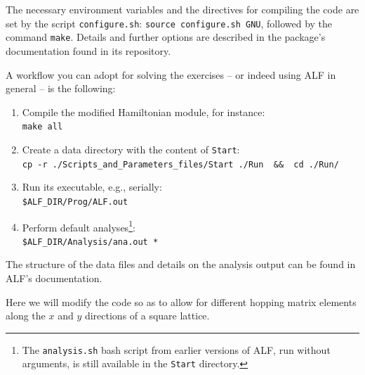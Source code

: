\documentclass[10pt,modern]{scrartcl}
\numberwithin{exerciseitem}{exercise} %
\begin{document}
The necessary environment variables and the directives for compiling the code are set by the script \texttt{configure.sh}: \lstinline[style=bash]|source configure.sh GNU|, followed by the command  \lstinline[style=bash,morekeywords={make}]|make|. Details and further options are described in the package's documentation found in its repository.

A workflow you can adopt for solving the exercises -- or indeed using ALF in general -- is the following:
\begin{enumerate}
	\item Compile the modified Hamiltonian module, for instance:\\
	\lstinline[style=bash,morekeywords={make}]{make all}
	\item Create a data directory with the content of \texttt{Start}:\\
	\lstinline[style=bash,morekeywords={cp}]{cp -r ./Scripts_and_Parameters_files/Start ./Run  &&  cd ./Run/}
	\item Run its executable, e.g., serially:\\
	\lstinline[style=bash]{$ALF_DIR/Prog/ALF.out} %
	\item Perform default analyses\footnote{The \texttt{analysis.sh} bash script from earlier versions of ALF, run without arguments, is still available in the \texttt{Start} directory.}:\\
	\lstinline[style=bash]{$ALF_DIR/Analysis/ana.out *} %
\end{enumerate}
The structure of the data files and details on the analysis output can be found in ALF's documentation.




Here we will modify the code  so as to allow  for different hopping matrix elements along the $x$ and $y$ directions of a square lattice.
\end{document}
